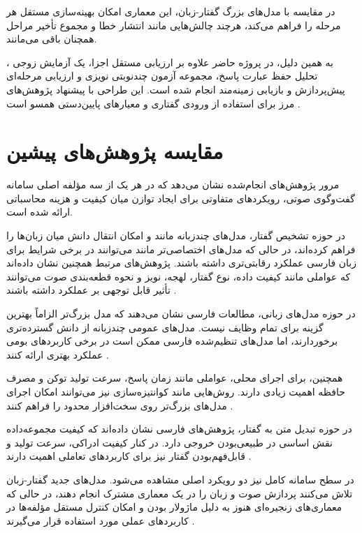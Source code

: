 در مقایسه با مدل‌های بزرگ گفتار-زبان، این معماری امکان
بهینه‌سازی مستقل هر مرحله را فراهم می‌کند، هرچند چالش‌هایی
مانند انتشار خطا و مجموع تأخیر مراحل همچنان باقی می‌مانند.

به همین دلیل، در پروژه حاضر علاوه بر ارزیابی مستقل اجزا، یک
آزمایش زوجی ، تحلیل حفظ عبارت پاسخ، مجموعه آزمون
چندنوبتی نویزی و ارزیابی مرحله‌ای پیش‌پردازش و بازیابی زمینه‌مند
انجام شده است. این طراحی با پیشنهاد پژوهش‌های مرز 
برای استفاده از ورودی گفتاری و معیارهای پایین‌دستی همسو است
\cite{faruqui2022boundary}.
\section{مقایسه پژوهش‌های پیشین}

مرور پژوهش‌های انجام‌شده نشان می‌دهد که در هر یک از سه مؤلفه
اصلی سامانه گفت‌وگوی صوتی، رویکردهای متفاوتی برای ایجاد توازن
میان کیفیت و هزینه محاسباتی ارائه شده است.

در حوزه تشخیص گفتار، مدل‌های چندزبانه مانند
و
امکان انتقال دانش میان زبان‌ها را فراهم کرده‌اند، در حالی که
مدل‌های اختصاصی‌تر مانند
می‌توانند در برخی شرایط برای زبان فارسی عملکرد رقابتی‌تری
داشته باشند.
پژوهش‌های مرتبط همچنین نشان داده‌اند که عواملی مانند کیفیت
داده، نوع گفتار، لهجه، نویز و نحوه قطعه‌بندی صوت می‌توانند
تأثیر قابل توجهی بر عملکرد  داشته باشند
\cite{conneau2020xlsr,radford2022whisper,sedghiyeh2025psrb}.

در حوزه مدل‌های زبانی، مطالعات فارسی نشان می‌دهند که مدل
بزرگ‌تر الزاماً بهترین گزینه برای تمام وظایف نیست.
مدل‌های عمومی چندزبانه از دانش گسترده‌تری برخوردارند، اما
مدل‌های تنظیم‌شده فارسی ممکن است در برخی کاربردهای بومی
عملکرد بهتری ارائه کنند
\cite{abaskohi2024persianllm,hosseinbeigi2025persianllm}.

همچنین، برای اجرای محلی، عواملی مانند زمان پاسخ، سرعت تولید
توکن و مصرف حافظه اهمیت زیادی دارند.
روش‌هایی مانند کوانتیزه‌سازی نیز می‌توانند امکان اجرای مدل‌های
بزرگ‌تر روی سخت‌افزار محدود را فراهم کنند
\cite{frantar2022gptq,lin2023awq}.

در حوزه تبدیل متن به گفتار، پژوهش‌های فارسی نشان داده‌اند که
کیفیت مجموعه‌داده نقش اساسی در طبیعی‌بودن خروجی دارد.
در کنار کیفیت ادراکی، سرعت تولید و قابل‌فهم‌بودن گفتار نیز
برای کاربردهای تعاملی اهمیت دارند
\cite{shamgholi2023armantts,qharabagh2025manatts}.

در سطح سامانه کامل نیز دو رویکرد اصلی مشاهده می‌شود.
مدل‌های جدید گفتار-زبان تلاش می‌کنند پردازش صوت و زبان را
در یک معماری مشترک انجام دهند، در حالی که معماری‌های زنجیره‌ای
هنوز به دلیل ماژولار بودن و امکان کنترل مستقل مؤلفه‌ها در
کاربردهای عملی مورد استفاده قرار می‌گیرند
\cite{zhang2023speechgpt,rubenstein2023audiopalm}.

